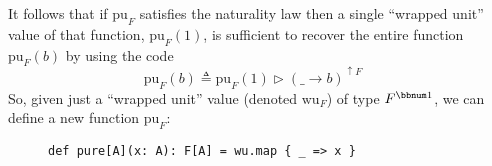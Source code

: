 It follows that if $\text{pu}_{F}$ satisfies the naturality law then
a single \textsf{``}wrapped unit\textsf{''} value of that function, $\text{pu}_{F}(1)$,
is sufficient to recover the entire function $\text{pu}_{F}(b)$ by
using the code
\[
\text{pu}_{F}(b)\triangleq\text{pu}_{F}(1)\triangleright(\_\rightarrow b)^{\uparrow F}\quad
\]
So, given just a \textsf{``}wrapped unit\textsf{''} value (denoted $\text{wu}_{F}$)
of type $F^{\bbnum 1}$, we can define a new function $\text{pu}_{F}$:

\begin{wrapfigure}{l}{0.46\columnwidth}%
\vspace{-0.8\baselineskip}
\begin{lstlisting}
def pure[A](x: A): F[A] = wu.map { _ => x }
\end{lstlisting}
\vspace{-0.5\baselineskip}
\end{wrapfigure}%

